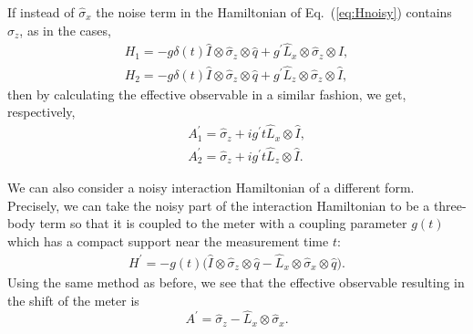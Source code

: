 \documentclass[aps,pra,showpacs,twoside,twocolumn,10pt]{revtex4-1}
\begin{document}
If instead of $\hat{\sigma}_x$ the noise term in the Hamiltonian of Eq.~(\ref{eq:Hnoisy}) contains $\hat{\sigma}_z$, as in the cases, %
\begin{eqnarray}
    H_1=-g\delta(t)\hat{I} \otimes \hat{\sigma}_z \otimes  \hat{q}+g^{\prime}  \hat{L}_x \otimes \hat{\sigma}_z \otimes \hat{I},    \nonumber \\
    H_2=-g\delta(t)\hat{I} \otimes \hat{\sigma}_z \otimes  \hat{q}+g^{\prime}  \hat{L}_z \otimes \hat{\sigma}_z \otimes \hat{I},
    \label{eq:noise:parallel}
\end{eqnarray}
then by calculating the effective observable in a similar fashion, we get, respectively,
\begin{eqnarray}
    &&A_1^{\prime}=\hat{\sigma}_z+ig^\prime t \hat{L}_x\otimes\hat{I},\nonumber \\
    &&A_2^{\prime}=\hat{\sigma}_z+ig^\prime t \hat{L}_z\otimes\hat{I}.
\end{eqnarray}

We can also consider a noisy interaction Hamiltonian of a different form. Precisely, we can 
take the noisy part of the interaction Hamiltonian to be a three-body term so that 
it is coupled to the meter with a coupling parameter $g(t)$ which has a compact support near the measurement time $t$: %
    \begin{eqnarray}
        H^\prime=-g(t)\big(\hat{I}\otimes\hat{\sigma}_z \otimes \hat{q}-\hat{L}_x\otimes\hat{\sigma}_x \otimes \hat{q}\big).
        \label{eq:Hnoisysimple}
    \end{eqnarray}
Using the same method as before, we see that the effective observable resulting in the shift of the meter is 
\begin{equation}  
    A^\prime=\hat{\sigma}_z-\hat{L}_x\otimes\hat{\sigma}_x
    \label{eq:A_w_1_noisy}.
   \end{equation}
\end{document}
